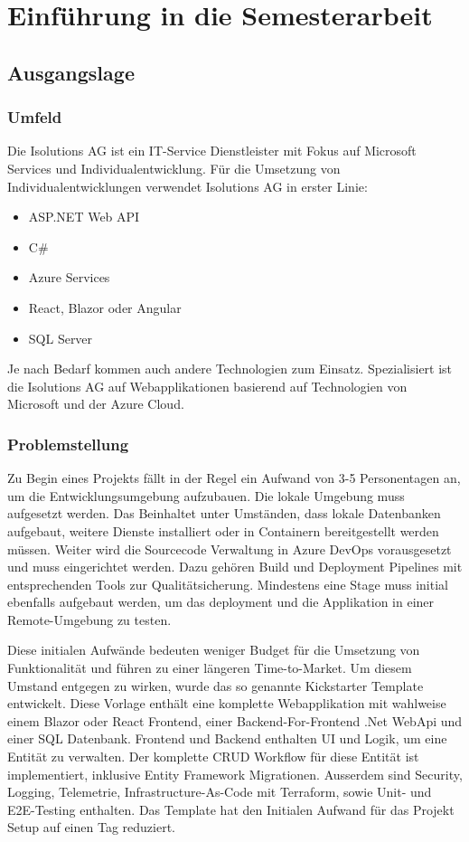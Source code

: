 \section{Einführung in die Semesterarbeit}
    \subsection{Ausgangslage}
        \subsubsection{Umfeld}
            Die Isolutions AG ist ein IT-Service Dienstleister mit Fokus auf Microsoft Services und Individualentwicklung. Für die Umsetzung von Individualentwicklungen verwendet Isolutions AG in erster Linie:
            \begin{itemize}
                \item ASP.NET Web API
                \item C\#
                \item Azure Services
                \item React, Blazor oder Angular
                \item SQL Server
            \end{itemize}
            Je nach Bedarf kommen auch andere Technologien zum Einsatz. Spezialisiert ist die Isolutions AG auf Webapplikationen basierend auf Technologien von Microsoft und der Azure Cloud.

        \subsubsection{Problemstellung}
            Zu Begin eines Projekts fällt in der Regel ein Aufwand von 3-5 Personentagen an, um die Entwicklungsumgebung aufzubauen. Die lokale Umgebung muss aufgesetzt werden. Das Beinhaltet unter Umständen, dass lokale Datenbanken aufgebaut, weitere Dienste installiert oder in Containern bereitgestellt werden müssen.
            Weiter wird die Sourcecode Verwaltung in Azure DevOps vorausgesetzt und muss eingerichtet werden. Dazu gehören Build und Deployment Pipelines mit entsprechenden Tools zur Qualitätsicherung. Mindestens eine Stage muss initial ebenfalls aufgebaut werden, um das deployment und die Applikation in einer Remote-Umgebung zu testen.

            Diese initialen Aufwände bedeuten weniger Budget für die Umsetzung von Funktionalität und führen zu einer längeren Time-to-Market. Um diesem Umstand entgegen zu wirken, wurde das so genannte Kickstarter Template entwickelt. Diese Vorlage enthält eine komplette Webapplikation mit wahlweise einem Blazor oder React Frontend, einer Backend-For-Frontend .Net WebApi und einer SQL Datenbank. Frontend und Backend enthalten UI und Logik, um eine Entität zu verwalten. Der komplette CRUD Workflow für diese Entität ist implementiert, inklusive Entity Framework Migrationen. Ausserdem sind Security, Logging, Telemetrie, Infrastructure-As-Code mit Terraform, sowie Unit- und E2E-Testing enthalten. Das Template hat den Initialen Aufwand für das Projekt Setup auf einen Tag reduziert.

